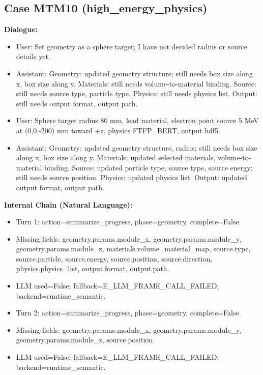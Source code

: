 \documentclass[11pt]{ctexart}
\begin{document}
\subsection{Case MTM10 (high\_energy\_physics)}
\textbf{Dialogue:}
\begin{itemize}
\item User: Set geometry as a sphere target; I have not decided radius or source details yet.
\item Assistant: Geometry: updated geometry structure; still needs box size along x, box size along y. Materials: still needs volume-to-material binding. Source: still needs source type, particle type. Physics: still needs physics list. Output: still needs output format, output path.
\item User: Sphere target radius 80 mm, lead material, electron point source 5 MeV at (0,0,-200) mm toward +z, physics FTFP\_BERT, output hdf5.
\item Assistant: Geometry: updated geometry structure, radius; still needs box size along x, box size along y. Materials: updated selected materials, volume-to-material binding. Source: updated particle type, source type, source energy; still needs source position. Physics: updated physics list. Output: updated output format, output path.
\end{itemize}
\textbf{Internal Chain (Natural Language):}
\begin{itemize}
\item Turn 1: action=summarize\_progress, phase=geometry, complete=False.
\item Missing fields: geometry.params.module\_x, geometry.params.module\_y, geometry.params.module\_z, materials.volume\_material\_map, source.type, source.particle, source.energy, source.position, source.direction, physics.physics\_list, output.format, output.path.
\item LLM used=False; fallback=E\_LLM\_FRAME\_CALL\_FAILED; backend=runtime\_semantic.
\item Turn 2: action=summarize\_progress, phase=geometry, complete=False.
\item Missing fields: geometry.params.module\_x, geometry.params.module\_y, geometry.params.module\_z, source.position.
\item LLM used=False; fallback=E\_LLM\_FRAME\_CALL\_FAILED; backend=runtime\_semantic.
\end{itemize}
\end{document}

